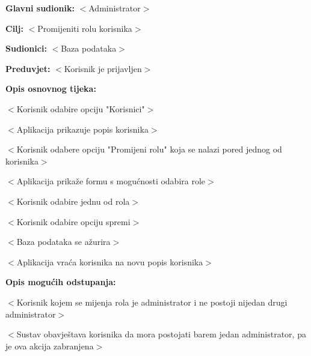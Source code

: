 					\noindent {}
					\begin{packed_item}

						\item \textbf{Glavni sudionik:} $<$Administrator$>$
						\item \textbf{Cilj:} $<$Promijeniti rolu korisnika$>$
						\item \textbf{Sudionici:} $<$Baza podataka$>$
						\item \textbf{Preduvjet:} $<$Korisnik je prijavljen$>$
						\item \textbf{Opis osnovnog tijeka:}

						\item[] \begin{packed_enum}

							\item $<$Korisnik odabire opciju "Korisnici"$>$
							\item $<$Aplikacija prikazuje popis korisnika$>$
							\item $<$Korisnik odabere opciju "Promijeni rolu" koja se nalazi pored jednog od korisnika$>$
							\item $<$Aplikacija prikaže formu s mogućnosti odabira role$>$
							\item $<$Korisnik odabire jednu od rola$>$
							\item $<$Korisnik odabire opciju spremi$>$
							\item $<$Baza podataka se ažurira$>$
							\item $<$Aplikacija vraća korisnika na novu popis korisnika$>$

						\end{packed_enum}

						\item \textbf{Opis mogućih odstupanja:}

						\item[] \begin{packed_item}

							\item[3.a] $<$Korisnik kojem se mijenja rola je administrator i ne postoji nijedan
							drugi administrator$>$
							\item[] \begin{packed_enum}

								\item $<$Sustav obavještava korisnika da mora postojati
								barem jedan administrator, pa je ova akcija zabranjena$>$

							\end{packed_enum}

						\end{packed_item}
					\end{packed_item}

